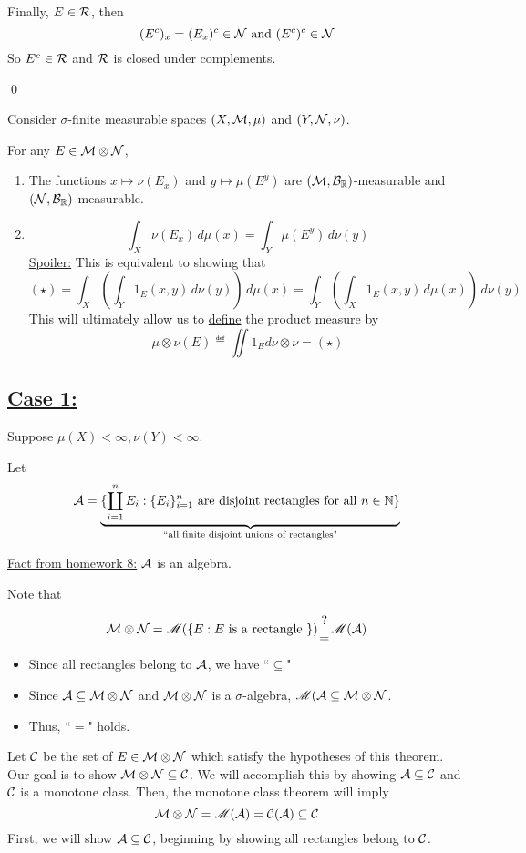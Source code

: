 \documentclass[x11names,reqno,14pt]{extarticle}
\newcommand*{\oo}{\infty}
\begin{document}
Finally, $E \in \mathcal{R}$, then
\[
(E^c)_x = (E_x)^c \in \mathcal{N}\text{ and }(E^c)^c\in\mathcal{N}
\]
So $E^c \in \mathcal{R}$ and $\mathcal{R}$ is closed under complements. 

\qed

\thm Consider $\sigma$-finite measurable spaces $(X, \mathcal{M}, \mu)$ and $(Y, \mathcal{N}, \nu)$. 

For any $E \in \mathcal{M}\otimes\mathcal{N}$, 
\begin{enumerate}[label=(\roman*)]
\item The functions $x\mapsto\nu(E_x)$ and $y\mapsto\mu(E^y)$ are $(\mathcal{M},\mathcal{B}_{\mathbb{R}})$-measurable and $(\mathcal{N}, \mathcal{B}_{\mathbb{R}})$-measurable. 
\item 
\[
\int_X\nu(E_x)\,d\mu(x) = \int_Y\mu(E^y)\,d\nu(y)
\]
\underline{Spoiler:} This is equivalent to showing that 
\[
(\star) = \int_X\left(\int_Y1_E(x, y)\,d\nu(y)\right)\,d\mu(x) = \int_Y\left(\int_X1_E(x, y)\,d\mu(x)\right)\,d\nu(y) 
\]
This will ultimately allow us to \underline{define} the product measure by 
\[
\mu\otimes\nu(E)\eqdef\iint1_Ed\nu\otimes\nu = (\star)
\]
\end{enumerate}

\proof

\subsection*{\underline{Case 1:}} Suppose $\mu(X)<\oo,\nu(Y)<\oo$. 

Let
\[
\mathcal{A} = \underbrace{\{\coprod_{i=1}^nE_i: \{E_i\}_{i=1}^n\text{ are disjoint rectangles for all }n\in\mathbb{N}\}}_{\text{``all finite disjoint unions of rectangles"}}
\]

\underline{Fact from homework 8:} $\mathcal{A}$ is an algebra. 

Note that

\[
\mathcal{M}\otimes\mathcal{N} = \mathscr{M}(\{E:E\text{ is a rectangle }\}){?\atop=} \mathscr{M}(\mathcal{A})
\]
\begin{itemize}
\item Since all rectangles belong to $\mathcal{A}$, we have ``$\subseteq$" 
\item Since $\mathcal{A}\subseteq\mathcal{M}\otimes\mathcal{N}$ and $\mathcal{M}\otimes\mathcal{N}$ is a $\sigma$-algebra, $\mathscr{M}(\mathcal{A}\subseteq\mathcal{M}\otimes\mathcal{N}$. 
\item Thus, ``$=$" holds.
\end{itemize}

Let $\mathcal{C}$ be the set of $E \in\mathcal{M}\otimes\mathcal{N}$ which satisfy the hypotheses of this theorem. Our goal is to show $\mathcal{M}\otimes\mathcal{N}\subseteq\mathcal{C}$. We will accomplish this by showing $\mathcal{A}\subseteq\mathcal{C}$ and $\mathcal{C}$ is a monotone class. Then, the monotone class theorem will imply 
\[
\mathcal{M}\otimes\mathcal{N} = \mathscr{M}(\mathcal{A}) = \mathcal{C}(\mathcal{A}) \subseteq \mathcal{C}
\]
First, we will show $\mathcal{A}\subseteq\mathcal{C}$, beginning by showing all rectangles belong to $\mathcal{C}$. 
\end{document}
